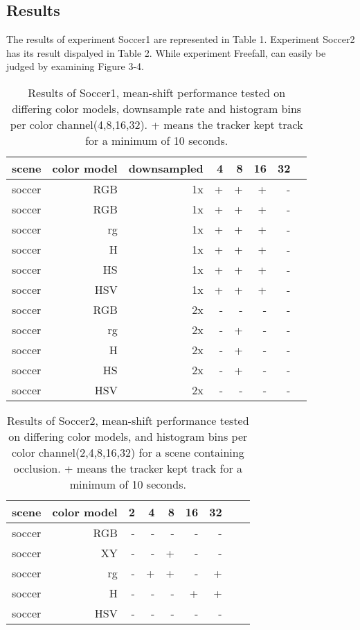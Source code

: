 \documentclass[a4paper,11pt]{article}
\begin{document}
\subsection{Results} 
The results of experiment Soccer1 are represented in Table 1. Experiment Soccer2 has its result dispalyed in Table 2. While experiment Freefall, can easily be judged by examining Figure 3-4.

\begin{table}
	\centering
	\caption{Results of Soccer1, mean-shift performance tested on differing color models, downsample rate and
	histogram bins per color channel(4,8,16,32). + means the tracker kept track for a minimum of 10 seconds.}

	\begin{tabular}{l*{7}{r|}}
		\label{table:fase1}
		scene	& 	color model	& downsampled 		   	& 4 & 8 & 16 & 32\\
		\hline
		soccer 	& 	RGB	 		& 1x		  			  & + & + & +  &  -\\
		soccer 	& 	RGB	 		& 1x		  			  & + & + & +  &  -\\
		soccer 	& 	rg	 		& 1x 		  			  & + & + & +  &  -\\
		soccer 	& 	H	 		& 1x		 			  & + & + & +  &  -\\
		soccer 	& 	HS	 		& 1x		  			  & + & + & +  &  -\\
		soccer 	& 	HSV	 		& 1x		  			  & + & + & +  &  -\\
		soccer 	& 	RGB	 		& 2x		  			  & - & - & -  &  -\\
		soccer 	& 	rg	 		& 2x 		  			  & - & + & -  &  -\\
		soccer 	& 	H	 		& 2x		  			  & - & + & -  &  -\\
		soccer 	& 	HS	 		& 2x		  			  & - & + & -  &  -\\
		soccer 	& 	HSV	 		& 2x		  			  & - & - & -  &  -\\
	\end{tabular}	
\end{table}

\begin{table}
	\centering
	\caption{Results of Soccer2, mean-shift performance tested on differing color models, and histogram bins per color channel(2,4,8,16,32) for a scene containing occlusion. + means the tracker kept track for a minimum of 10 seconds.} 
	\begin{tabular}{l*{8}{r|}}
		\label{table:fase2}
		scene	& 	color model	&  2 & 4 & 8 & 16 & 32\\
		\hline
		soccer 	& 	RGB	 		&  - & - & - & - & -\\
		soccer 	& 	XY	 		&  - & - & + & - & -\\
		soccer 	& 	rg	 		&  - & + & + & - & +\\
		soccer 	& 	H	 		&  - & - & - & + & +\\
		soccer 	& 	HSV	 		&  - & - & - & - & -\\ 
	\end{tabular}	
\end{table}	
\end{document}
